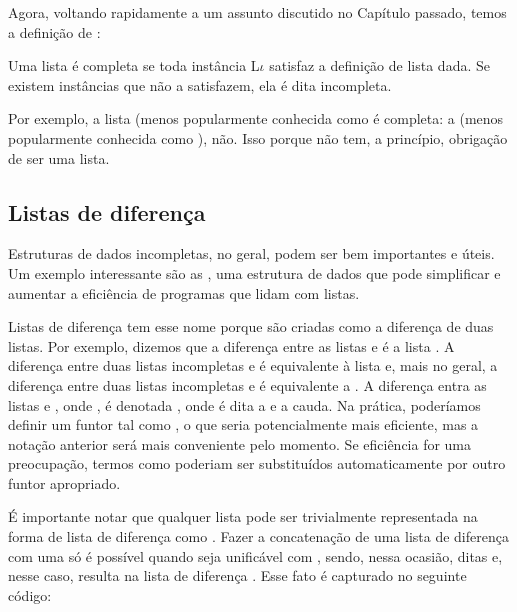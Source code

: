 Agora, voltando rapidamente a um assunto discutido no Capítulo passado, temos a definição de :

\begin{definition} Uma lista  é completa se toda instância L$\iota$ satisfaz a definição de lista dada. Se existem instâncias que não a satisfazem, ela é dita incompleta.
\end{definition}

Por exemplo, a lista \codigo{[a,b,c]} (menos popularmente conhecida como   é completa: a \codigo{[a,b|Xs]} (menos popularmente conhecida como  ), não. Isso porque  não tem, a princípio, obrigação de ser uma lista.



\subsection{Listas de diferença}

Estruturas de dados incompletas, no geral, podem ser bem importantes e úteis. Um exemplo interessante são as , uma estrutura de dados que pode simplificar e aumentar a eficiência de programas que lidam com listas.

Listas de diferença tem esse nome porque são criadas como a diferença de duas listas. Por exemplo, dizemos que  a diferença entre as listas
\codigo{[a,b,c]} e \codigo{[c]} é a lista \codigo{[a,b]}. A diferença entre duas listas incompletas \codigo{[a,b|Xs]} e  é equivalente à lista \codigo{[a,b]} e, mais no geral, a diferença entre duas listas incompletas \codigo{[$x_0$, ...,$x_i$|Xs]} e  é equivalente a \codigo{[$x_0$, ...,$x_i$]}.
A diferença entra as listas  e , onde , é denotada , onde  é dita a  e  a cauda. Na prática,
poderíamos definir um funtor tal como , o que seria potencialmente mais eficiente, mas a notação anterior será
mais conveniente pelo momento. Se eficiência for uma preocupação, termos como  poderiam ser substituídos automaticamente por outro funtor apropriado.

É importante notar que qualquer lista  pode ser trivialmente representada na forma de lista de diferença como . Fazer a concatenação de uma lista de diferença  com uma 
só é possível quando  seja unificável com , sendo, nessa ocasião, ditas   e, nesse caso, resulta na lista de diferença . Esse fato é capturado no seguinte código:

